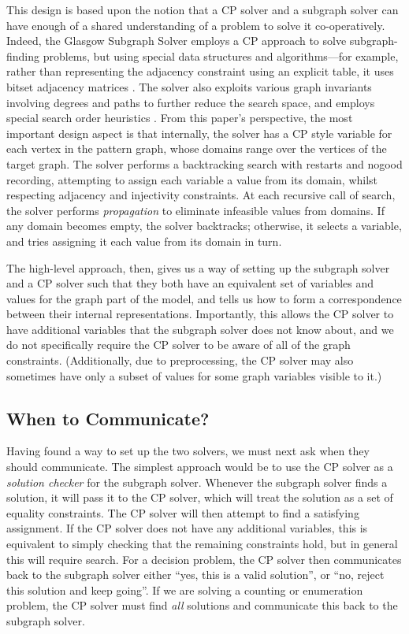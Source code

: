 \documentclass[runningheads]{llncs}
\begin{document}
This design is based upon the notion that a CP solver and a subgraph solver can have enough of a
shared understanding of a problem to solve it co-operatively. Indeed, the Glasgow Subgraph Solver
\cite{DBLP:conf/gg/McCreeshP020} employs a CP approach to solve subgraph-finding problems, but using
special data structures and algorithms---for example, rather than representing the adjacency
constraint using an explicit table, it uses bitset adjacency matrices
\cite{DBLP:conf/cp/McCreeshP15}. The solver also exploits various graph invariants involving degrees
\cite{DBLP:journals/constraints/ZampelliDS10} and paths \cite{DBLP:conf/cp/AudemardLMGP14} to
further reduce the search space, and employs special search order heuristics
\cite{DBLP:conf/cpaior/ArchibaldDHMP019}. From this paper's perspective, the most important design
aspect is that internally, the solver has a CP style variable for each vertex in the pattern graph,
whose domains range over the vertices of the target graph. The solver performs a backtracking search
with restarts and nogood recording, attempting to assign each variable a value from its domain,
whilst respecting adjacency and injectivity constraints. At each recursive call of search, the
solver performs \emph{propagation} to eliminate infeasible values from domains. If any domain
becomes empty, the solver backtracks; otherwise, it selects a variable, and tries assigning it each
value from its domain in turn.

The high-level approach, then, gives us a way of setting up the subgraph solver and a CP solver such
that they both have an equivalent set of variables and values for the graph part of the model,
and tells us how to form a correspondence between their internal representations. Importantly, this
allows the CP solver to have additional variables that the subgraph solver does not know about, and
we do not specifically require the CP solver to be aware of all of the graph constraints.
(Additionally, due to preprocessing, the CP solver may also sometimes have only a subset of values
for some graph variables visible to it.)

\subsection{When to Communicate?}

Having found a way to set up the two solvers, we must next ask when they should communicate. The
simplest approach would be to use the CP solver as a \emph{solution checker} for the subgraph
solver.  Whenever the subgraph solver finds a solution, it will pass it to the CP solver, which will
treat the solution as a set of equality constraints. The CP solver will then attempt to find a
satisfying assignment. If the CP solver does not have any additional variables, this is equivalent
to simply checking that the remaining constraints hold, but in general this will require search.
For a decision problem, the CP solver then communicates back to the subgraph solver either ``yes,
this is a valid solution'', or ``no, reject this solution and keep going''. If we are solving a
counting or enumeration problem, the CP solver must find \emph{all} solutions and communicate this
back to the subgraph solver.
\end{document}

